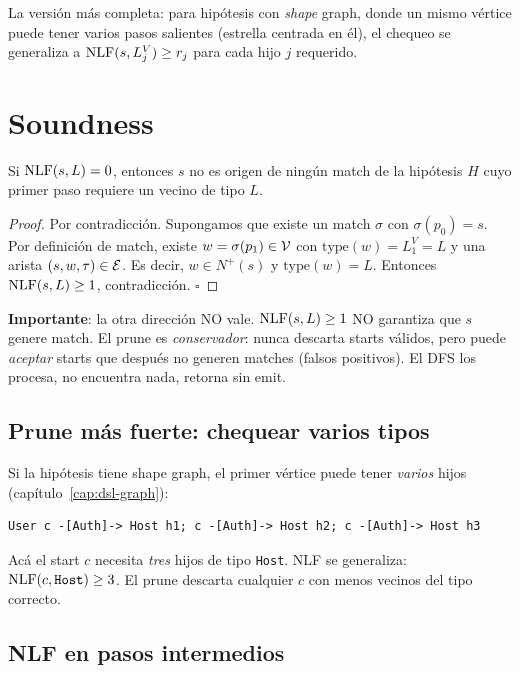 \noindent
La versión más completa: para hipótesis con \emph{shape} graph,
donde un mismo vértice puede tener varios pasos salientes
(estrella centrada en él), el chequeo se generaliza a
\(\mathrm{NLF}(s, L_j^V) \geq r_j\) para cada hijo \(j\) requerido.

\section{Soundness}

\begin{theorem}
Si \(\mathrm{NLF}(s, L) = 0\), entonces \(s\) no es origen de ningún match
de la hipótesis \(H\) cuyo primer paso requiere un vecino de tipo
\(L\).
\end{theorem}

\begin{proof}
Por contradicción. Supongamos que existe un match
\(\sigma\) con \(\sigma(p_0) = s\). Por definición de match, existe
\(w = \sigma(p_1) \in \mathcal{V}\) con \(\mathrm{type}(w) = L_1^V = L\) y
una arista \((s, w, \tau) \in \mathcal{E}\). Es decir,
\(w \in N^{+}(s)\) y \(\mathrm{type}(w) = L\). Entonces
\(\mathrm{NLF}(s, L) \geq 1\), contradicción. \(\square\)
\end{proof}

\noindent
\textbf{Importante}: la otra dirección NO vale. \(\mathrm{NLF}(s, L) \geq
1\) NO garantiza que \(s\) genere match. El prune es
\emph{conservador}: nunca descarta starts válidos, pero puede
\emph{aceptar} starts que después no generen matches (falsos
positivos). El DFS los procesa, no encuentra nada, retorna sin
emit.

\subsection{Prune más fuerte: chequear varios tipos}

Si la hipótesis tiene shape graph, el primer vértice puede tener
\emph{varios} hijos (capítulo~\ref{cap:dsl-graph}):

\begin{lstlisting}
User c -[Auth]-> Host h1; c -[Auth]-> Host h2; c -[Auth]-> Host h3
\end{lstlisting}

\noindent
Acá el start \(c\) necesita \emph{tres} hijos de tipo \texttt{Host}.
NLF se generaliza: \(\mathrm{NLF}(c, \texttt{Host}) \geq 3\). El prune
descarta cualquier \(c\) con menos vecinos del tipo correcto.

\subsection{NLF en pasos intermedios}

